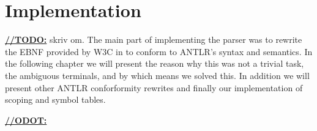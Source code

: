 \chapter{Implementation}

\underline{\textbf{\LARGE //TODO:}} skriv om.
The main part of implementing the parser was to rewrite the EBNF provided by W3C in \cite{w3c01} to conform to ANTLR's syntax and semantics. In the following chapter we will present the reason why this was not a trivial task, the ambiguous terminals, and by which means we solved this. In addition we will present other ANTLR conforformity rewrites and finally our implementation of scoping and symbol tables.

\underline{\textbf{\LARGE //ODOT:}}




